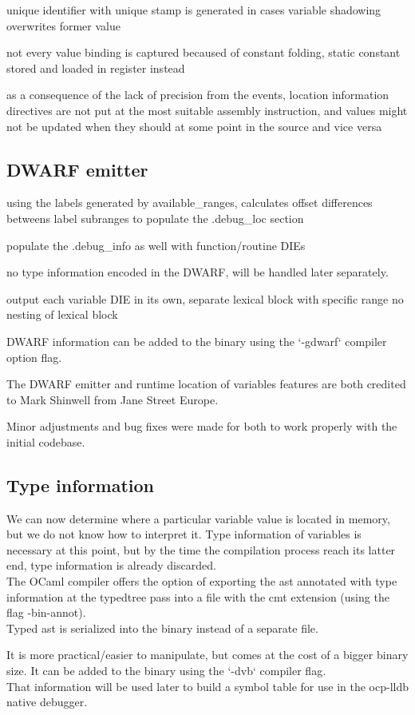unique identifier with unique stamp is generated in cases variable shadowing overwrites former value

not every value binding is captured becaused of constant folding, static
constant stored and loaded in register instead

as a consequence of the lack of precision from the events,
location information directives are not put at the
most suitable assembly instruction, and values might not be updated when they should
at some point in the source and vice versa

\subsection{DWARF emitter}

using the labels generated by available\_ranges, calculates offset differences
betweens label subranges to populate the .debug\_loc section

populate the  .debug\_info as well with function/routine DIEs

no type information encoded in the DWARF, will be handled later separately.

output each variable DIE in its own, separate lexical block with specific range
no nesting of lexical block

DWARF information can be added to the binary using the `-gdwarf` compiler option flag.

The DWARF emitter and runtime location of variables features are both credited to
Mark Shinwell from Jane Street Europe.

Minor adjustments and bug fixes were made for both to work properly with the initial codebase.

\subsection{Type information}

We can now determine where a particular variable value is located in memory, but
we do not know how to interpret it. Type information of variables is necessary
at this point, but by the time the compilation process reach its latter end,
type information is already discarded. \\

The OCaml compiler offers the option of exporting the \gls{ast} annotated with type
information at the typedtree pass into a file with the cmt extension (using the
flag -bin-annot). \\

Typed \gls{ast} is serialized into the binary instead of a separate file.

It is more practical/easier to manipulate, but comes at the cost of a bigger binary
size.
It can be added to the binary using the `-dvb` compiler flag.\\

That information will be used later to build a symbol table for use in the
ocp-lldb native debugger.

